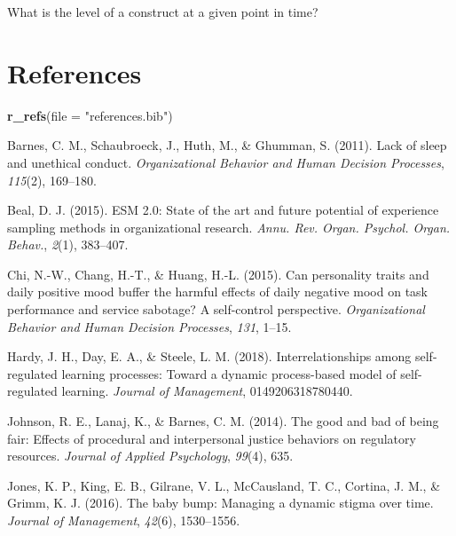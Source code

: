\documentclass[english,,man]{apa6}
\newenvironment{Shaded}{\begin{snugshade}}{\end{snugshade}}
\newcommand{\DataTypeTok}[1]{\textcolor[rgb]{0.13,0.29,0.53}{#1}}
\newcommand{\KeywordTok}[1]{\textcolor[rgb]{0.13,0.29,0.53}{\textbf{#1}}}
\newcommand{\NormalTok}[1]{#1}
\newcommand{\StringTok}[1]{\textcolor[rgb]{0.31,0.60,0.02}{#1}}
\theoremstyle{definition}
\theoremstyle{definition}
\theoremstyle{definition}
\theoremstyle{remark}
\begin{document}
What is the level of a construct at a given point in time?

\newpage

\hypertarget{references}{%
\section{References}\label{references}}

\begin{Shaded}
\begin{Highlighting}[]
\KeywordTok{r_refs}\NormalTok{(}\DataTypeTok{file =} \StringTok{"references.bib"}\NormalTok{)}
\end{Highlighting}
\end{Shaded}

\setlength{\parindent}{-0.5in}
\setlength{\leftskip}{0.5in}

\hypertarget{refs}{}
\leavevmode\hypertarget{ref-barnes2011}{}%
Barnes, C. M., Schaubroeck, J., Huth, M., \& Ghumman, S. (2011). Lack of
sleep and unethical conduct. \emph{Organizational Behavior and Human
Decision Processes}, \emph{115}(2), 169--180.

\leavevmode\hypertarget{ref-beal2015}{}%
Beal, D. J. (2015). ESM 2.0: State of the art and future potential of
experience sampling methods in organizational research. \emph{Annu. Rev.
Organ. Psychol. Organ. Behav.}, \emph{2}(1), 383--407.

\leavevmode\hypertarget{ref-chi2015}{}%
Chi, N.-W., Chang, H.-T., \& Huang, H.-L. (2015). Can personality traits
and daily positive mood buffer the harmful effects of daily negative
mood on task performance and service sabotage? A self-control
perspective. \emph{Organizational Behavior and Human Decision
Processes}, \emph{131}, 1--15.

\leavevmode\hypertarget{ref-hardy2018}{}%
Hardy, J. H., Day, E. A., \& Steele, L. M. (2018). Interrelationships
among self-regulated learning processes: Toward a dynamic process-based
model of self-regulated learning. \emph{Journal of Management},
0149206318780440.

\leavevmode\hypertarget{ref-johnson2014}{}%
Johnson, R. E., Lanaj, K., \& Barnes, C. M. (2014). The good and bad of
being fair: Effects of procedural and interpersonal justice behaviors on
regulatory resources. \emph{Journal of Applied Psychology},
\emph{99}(4), 635.

\leavevmode\hypertarget{ref-jones2016}{}%
Jones, K. P., King, E. B., Gilrane, V. L., McCausland, T. C., Cortina,
J. M., \& Grimm, K. J. (2016). The baby bump: Managing a dynamic stigma
over time. \emph{Journal of Management}, \emph{42}(6), 1530--1556.
\end{document}
